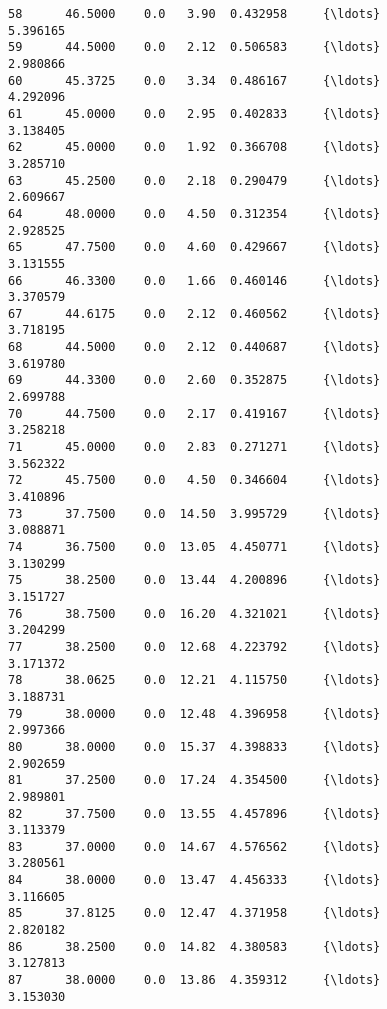 \documentclass[11pt]{article}
\begin{document}
\begin{Verbatim}[commandchars=\\\{\}]
58      46.5000    0.0   3.90  0.432958     {\ldots}                   5.396165   
59      44.5000    0.0   2.12  0.506583     {\ldots}                   2.980866   
60      45.3725    0.0   3.34  0.486167     {\ldots}                   4.292096   
61      45.0000    0.0   2.95  0.402833     {\ldots}                   3.138405   
62      45.0000    0.0   1.92  0.366708     {\ldots}                   3.285710   
63      45.2500    0.0   2.18  0.290479     {\ldots}                   2.609667   
64      48.0000    0.0   4.50  0.312354     {\ldots}                   2.928525   
65      47.7500    0.0   4.60  0.429667     {\ldots}                   3.131555   
66      46.3300    0.0   1.66  0.460146     {\ldots}                   3.370579   
67      44.6175    0.0   2.12  0.460562     {\ldots}                   3.718195   
68      44.5000    0.0   2.12  0.440687     {\ldots}                   3.619780   
69      44.3300    0.0   2.60  0.352875     {\ldots}                   2.699788   
70      44.7500    0.0   2.17  0.419167     {\ldots}                   3.258218   
71      45.0000    0.0   2.83  0.271271     {\ldots}                   3.562322   
72      45.7500    0.0   4.50  0.346604     {\ldots}                   3.410896   
73      37.7500    0.0  14.50  3.995729     {\ldots}                   3.088871   
74      36.7500    0.0  13.05  4.450771     {\ldots}                   3.130299   
75      38.2500    0.0  13.44  4.200896     {\ldots}                   3.151727   
76      38.7500    0.0  16.20  4.321021     {\ldots}                   3.204299   
77      38.2500    0.0  12.68  4.223792     {\ldots}                   3.171372   
78      38.0625    0.0  12.21  4.115750     {\ldots}                   3.188731   
79      38.0000    0.0  12.48  4.396958     {\ldots}                   2.997366   
80      38.0000    0.0  15.37  4.398833     {\ldots}                   2.902659   
81      37.2500    0.0  17.24  4.354500     {\ldots}                   2.989801   
82      37.7500    0.0  13.55  4.457896     {\ldots}                   3.113379   
83      37.0000    0.0  14.67  4.576562     {\ldots}                   3.280561   
84      38.0000    0.0  13.47  4.456333     {\ldots}                   3.116605   
85      37.8125    0.0  12.47  4.371958     {\ldots}                   2.820182   
86      38.2500    0.0  14.82  4.380583     {\ldots}                   3.127813   
87      38.0000    0.0  13.86  4.359312     {\ldots}                   3.153030   


\end{Verbatim}
\end{document}
